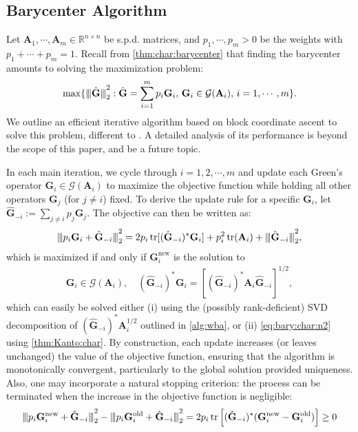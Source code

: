 \documentclass[noinfoline]{imsart}\setcounter{tocdepth}{2}
\renewcommand{\b}[1]{\mathbb{#1}} %
\newcommand{\m}[1]{\mathbf{#1}} %
\renewcommand{\c}[1]{\mathcal{#1}} %
\DeclareMathOperator*{\tr}{tr}
\newcommand{\vertii}[1]{{\vert\kern-0.25ex\vert\kern-0.25ex\vert #1 
    \vert\kern-0.25ex\vert\kern-0.25ex\vert}} %
\theoremstyle{plain}
\begin{document}
\subsection{Barycenter Algorithm}
Let $\m{A}_{1}, \cdots, \m{A}_{m}  \in \b{R}^{n \times n}$ be s.p.d. matrices, and $p_{1}, \cdots, p_{m} > 0$ be the weights with $p_{1} + \cdots + p_{m} = 1$. Recall from \cref{thm:char:barycenter} that finding the barycenter amounts to solving the maximization problem: 
\begin{equation*}
    \max \{ \vertii{\hat{\m{G}}}_{2}^{2} : \hat{\m{G}} = \sum_{i=1}^{m} p_{i} \m{G}_{i}, \, \m{G}_{i} \in \c{G}(\m{A}_{i}), \, i =1, \cdots, m \}.
\end{equation*}
We outline an efficient iterative algorithm based on block coordinate ascent to solve this problem, different to \cite{bhatia2019bures,pigoli2014distances,masarotto2019procrustes}. A detailed analysis of its performance is beyond the scope of this paper, and be a future topic. 

In each main iteration, we cycle through $i = 1, 2, \cdots, m$ and update each Green's operator $\m{G}_{i} \in \c{G}(\m{A}_{i})$ to maximize the objective function while holding all other operators $\m{G}_{j}$ (for $j \ne i$) fixed. To derive the update rule for a specific $\m{G}_{i}$, let $\hat{\m{G}}_{-i} := \sum_{j \ne i} p_{j} \m{G}_{j}$. The objective can then be written as:
\begin{align*}
    \vertii{p_{i} \m{G}_{i} + \hat{\m{G}}_{-i} }_{2}^{2} = 2 p_{i} \tr [ (\hat{\m{G}}_{-i})^{*} \m{G}_{i} ] + p_{i}^{2} \tr(\m{A}_{i}) + \vertii{\hat{\m{G}}_{-i}}_{2}^{2},
\end{align*}
which is maximized if and only if $\m{G}_{i}^{\text{new}}$ is the solution to 
\begin{align*}
    \m{G}_{i} \in \c{G}(\m{A}_{i}), \quad (\hat{\m{G}}_{-i})^{*} \m{G}_{i} = [ (\hat{\m{G}}_{-i})^{*} \m{A}_{i} \hat{\m{G}}_{-i} ]^{1/2},
\end{align*}
which can easily be solved either (i) using the (possibly rank-deficient) SVD decomposition of $(\hat{\m{G}}_{-i})^{*} \m{A}_{i}^{1/2}$ outlined in \cref{alg:wba}, or (ii) \eqref{eq:bary:char:n2} using \cref{thm:Kanto:char}. By construction, each update increases (or leaves unchanged) the value of the objective function, ensuring that the algorithm is monotonically convergent, particularly to the global solution provided uniqueness. Also, one may incorporate a natural stopping criterion: the process can be terminated when the increase in the objective function is negligible:
\begin{equation*}
    \vertii{p_{i} \m{G}_{i}^{\text{new}} + \hat{\m{G}}_{-i}}_{2}^{2} - \vertii{p_{i} \m{G}_{i}^{\text{old}} + \hat{\m{G}}_{-i} }_{2}^{2} = 2 p_{i} \tr \left[ (\hat{\m{G}}_{-i})^{*} (\m{G}_{i}^{\text{new}} - \m{G}_{i}^{\text{old}})  \right] \ge 0
\end{equation*}
\end{document}
